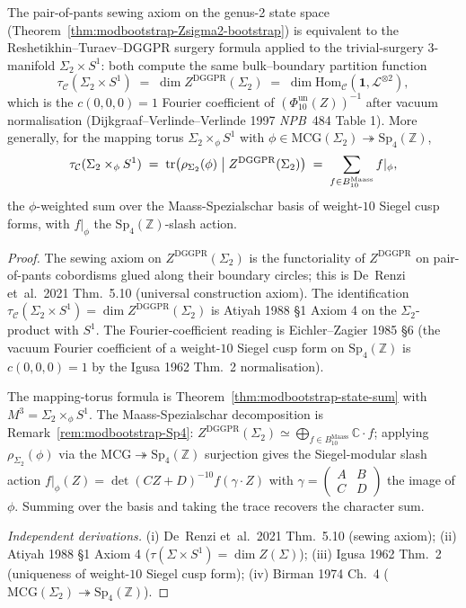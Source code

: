 \begin{theorem}
\label{thm:modbootstrap-sewing-equivalence}
The pair-of-pants sewing axiom on the genus-2 state space
(Theorem~\ref{thm:modbootstrap-Zsigma2-bootstrap}) is
equivalent to the Reshetikhin--Turaev--DGGPR surgery formula applied
to the trivial-surgery 3-manifold $\Sigma_2\times S^1$: both compute
the same bulk--boundary partition function
\[
 \tau_{\mathcal C}(\Sigma_2\times S^1)
 \;=\;
 \dim Z^{\mathrm{DGGPR}}(\Sigma_2)
 \;=\;
 \dim\mathrm{Hom}_{\mathcal C}(\mathbf 1, \mathcal L^{\otimes 2}),
\]
which is the $c(0, 0, 0) = 1$ Fourier coefficient of
$(\Phi_{10}^{\mathrm{un}}(Z))^{-1}$ after vacuum normalisation
(Dijkgraaf--Verlinde--Verlinde 1997 \emph{NPB}~484 Table 1). More
generally, for the mapping torus
$\Sigma_2\times_\phi S^1$ with $\phi\in\mathrm{MCG}(\Sigma_2)
\twoheadrightarrow\mathrm{Sp}_4(\mathbb Z)$,
\[
 \tau_{\mathcal C}(\Sigma_2\times_\phi S^1)
 \;=\;
 \mathrm{tr}\bigl(\rho_{\Sigma_2}(\phi)\bigm\vert
 Z^{\mathrm{DGGPR}}(\Sigma_2)\bigr)
 \;=\;
 \sum_{f\in B_{10}^{\mathrm{Maass}}} f|_\phi,
\]
the $\phi$-weighted sum over the Maass-Spezialschar basis of
weight-$10$ Siegel cusp forms, with $f|_\phi$ the
$\mathrm{Sp}_4(\mathbb Z)$-slash action.
\end{theorem}

\begin{proof}
The sewing axiom on $Z^{\mathrm{DGGPR}}(\Sigma_2)$ is the functoriality
of $Z^{\mathrm{DGGPR}}$ on pair-of-pants cobordisms glued along their
boundary circles; this is De~Renzi et~al.\ 2021 Thm.~5.10 (universal
construction axiom). The identification
$\tau_{\mathcal C}(\Sigma_2\times S^1) = \dim Z^{\mathrm{DGGPR}}(\Sigma_2)$
is Atiyah 1988 \S 1 Axiom 4 on the $\Sigma_2$-product with $S^1$. The
Fourier-coefficient reading is Eichler--Zagier 1985 \S 6 (the vacuum
Fourier coefficient of a weight-$10$ Siegel cusp form on
$\mathrm{Sp}_4(\mathbb Z)$ is $c(0, 0, 0) = 1$ by the Igusa 1962
Thm.~2 normalisation).

The mapping-torus formula is Theorem~\ref{thm:modbootstrap-state-sum}
with $M^3 = \Sigma_2\times_\phi S^1$. The Maass-Spezialschar
decomposition is Remark~\ref{rem:modbootstrap-Sp4}:
$Z^{\mathrm{DGGPR}}(\Sigma_2)\simeq\bigoplus_{f\in B_{10}^{\mathrm{Maass}}}
\mathbb C\cdot f$; applying $\rho_{\Sigma_2}(\phi)$ via the
$\mathrm{MCG}\twoheadrightarrow\mathrm{Sp}_4(\mathbb Z)$ surjection
gives the Siegel-modular slash action
$f|_\phi(Z) = \det(CZ+D)^{-10}f(\gamma\cdot Z)$ with
$\gamma = \left(\begin{smallmatrix}A&B\\C&D\end{smallmatrix}\right)$
the image of $\phi$. Summing over the basis and taking the trace
recovers the character sum.

\emph{Independent derivations.}
(i) De~Renzi et~al.\ 2021 Thm.~5.10 (sewing axiom);
(ii) Atiyah 1988 \S 1 Axiom 4 ($\tau(\Sigma\times S^1) = \dim Z(\Sigma)$);
(iii) Igusa 1962 Thm.~2 (uniqueness of weight-$10$ Siegel cusp form);
(iv) Birman 1974 Ch.~4 ($\mathrm{MCG}(\Sigma_2)
\twoheadrightarrow\mathrm{Sp}_4(\mathbb Z)$).
\end{proof}

